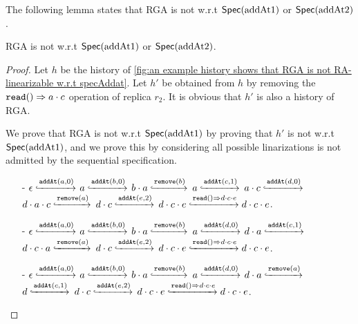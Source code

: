 The following lemma states that RGA is not \crdtlinearizable{} w.r.t $\specAddatOne$ or $\specAddatTwo$. 

\begin{lemma}
\label{lemma:The history h of fig an example history shows that RGA is not RA-linarizable w.r.t specAddat is not RA-linearizable w.r.t SpecAddatOne or SpecAddatTwo}
RGA is not \crdtlinearizable{} w.r.t $\specAddatOne$ or $\specAddatTwo$. 
\end{lemma}

\begin {proof} 
Let $h$ be the history of \autoref{fig:an example history shows that RGA is not RA-linearizable w.r.t specAddat}. Let $h'$ be obtained from $h$ by removing the $\alabellong[\mathtt{read}]{}{a \cdot c}{}$ operation of replica $r_2$. It is obvious that $h'$ is also a history of RGA. 

We prove that RGA is not \crdtlinearizable{} w.r.t $\specAddatOne$ by proving that $h'$ is not \crdtlinearizable{} w.r.t $\specAddatOne$, and we prove this by considering all possible linarizations is not admitted by the sequential specification. 

\begin{itemize}
\setlength{\itemsep}{0.5pt}
\item[-] $\epsilon \specarrow{\alabelshort[\mathtt{addAt}]{a,0}}$ $a \specarrow{\alabelshort[\mathtt{addAt}]{b,0}}$ $b \cdot a \specarrow{\alabelshort[\mathtt{remove}]{b}}$ $a \specarrow{\alabelshort[\mathtt{addAt}]{c,1}}$ $a \cdot c \specarrow{\alabelshort[\mathtt{addAt}]{d,0}}$ $d \cdot a \cdot c \specarrow{\alabelshort[\mathtt{remove}]{a}}$ $d \cdot c \specarrow{\alabelshort[\mathtt{addAt}]{e,2}}$ $d \cdot c \cdot e \specarrow{\alabellong[\mathtt{read}]{}{d \cdot c \cdot e}{}} d \cdot c \cdot e$. 

\item[-] $\epsilon \specarrow{\alabelshort[\mathtt{addAt}]{a,0}}$ $a \specarrow{\alabelshort[\mathtt{addAt}]{b,0}}$ $b \cdot a \specarrow{\alabelshort[\mathtt{remove}]{b}}$ $a \specarrow{\alabelshort[\mathtt{addAt}]{d,0}}$ $d \cdot a \specarrow{\alabelshort[\mathtt{addAt}]{c,1}}$ $d \cdot c \cdot a \specarrow{\alabelshort[\mathtt{remove}]{a}}$ $d \cdot c \specarrow{\alabelshort[\mathtt{addAt}]{e,2}}$ $d \cdot c \cdot e \specarrow{\alabellong[\mathtt{read}]{}{d \cdot c \cdot e}{}} d \cdot c \cdot e$. 

\item[-] $\epsilon \specarrow{\alabelshort[\mathtt{addAt}]{a,0}}$ $a \specarrow{\alabelshort[\mathtt{addAt}]{b,0}}$ $b \cdot a \specarrow{\alabelshort[\mathtt{remove}]{b}}$ $a \specarrow{\alabelshort[\mathtt{addAt}]{d,0}}$ $d \cdot a \specarrow{\alabelshort[\mathtt{remove}]{a}}$ $d \specarrow{\alabelshort[\mathtt{addAt}]{c,1}}$ $d \cdot c \specarrow{\alabelshort[\mathtt{addAt}]{e,2}}$ $d \cdot c \cdot e \specarrow{\alabellong[\mathtt{read}]{}{d \cdot c \cdot e}{}} d \cdot c \cdot e$. 


\end{itemize}
\end{proof}
